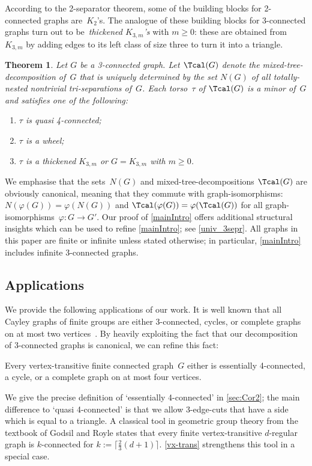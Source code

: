 \documentclass{aic}
\theoremstyle{plain}
\theoremstyle{definition}
\theoremstyle{plain}
\theoremstyle{plain}
\newtheorem{main}{Theorem}
\renewcommand{\geq}{\geqslant}
\renewcommand{\ge}{\geqslant}
\begin{document}
According to the 2-separator theorem, some of the building blocks for 2-connected graphs are~$K_2$'s.
The analogue of these building blocks for 3-connected graphs turn out to be~\emph{thickened $K_{3,m}$'s} with $m\ge 0$: these are obtained from $K_{3,m}$ by adding edges to its left class of size three to turn it into a triangle.

\begin{main}\label{mainIntro}
Let $G$ be a 3-connected graph. 
Let $\Tcal(G)$ denote the mixed-tree-decomposition of~$G$ that is uniquely determined by the set $N(G)$ of all totally-nested nontrivial tri-separations of~$G$.
Each torso~$\tau$ of $\Tcal(G)$ is a minor of~$G$ and satisfies one of the following:
\begin{enumerate}
    \item $\tau$ is quasi 4-connected;
    \item $\tau$ is a wheel;
    \item $\tau$ is a thickened $K_{3,m}$ or $G=K_{3,m}$ with $m\geq 0$.
\end{enumerate}
\end{main}
We emphasise that the sets~$N(G)$ and mixed-tree-decompositions $\Tcal(G)$ are obviously canonical, meaning that they commute with graph-isomorphisms: $N(\varphi(G))=\varphi(N(G))$ and $\Tcal(\varphi(G))=\varphi(\Tcal(G))$ for all graph-isomorphisms~$\varphi\colon G\to G'$.
Our proof of \autoref{mainIntro} offers additional structural insights which can be used to refine \autoref{mainIntro}; see \autoref{univ_3sepr}.
All graphs in this paper are finite or infinite unless stated otherwise; in particular, \autoref{mainIntro} includes infinite 3-connected graphs.

\subsection*{Applications}
We provide the following applications of our work.
It is well known that all Cayley graphs of finite groups are either 3-connected, cycles, or complete graphs on at most two vertices~\cite{infiniteSPQR}.
By heavily exploiting the fact that our decomposition of 3-connected graphs is canonical, we can refine this fact:

\begin{mcor}\label{vx-trans}
Every vertex-transitive finite connected graph~$G$ either is essentially 4-connected, a cycle, or a complete graph on at most four vertices.
\end{mcor}
We give the precise definition of `essentially 4-connected' in \autoref{sec:Cor2}; the main difference to `quasi 4-connected' is that we allow 3-edge-cuts that have a side which is equal to a triangle.
A classical tool in geometric group theory from the textbook of Godsil and Royle \cite[Theorem 3.4.2]{AlgebraicGT} states that every finite vertex-transitive $d$-regular graph is $k$-connected for $k:=\lceil \frac{2}{3}(d+1)\rceil$.
\autoref{vx-trans} strengthens this tool in a special case.
\end{document}

